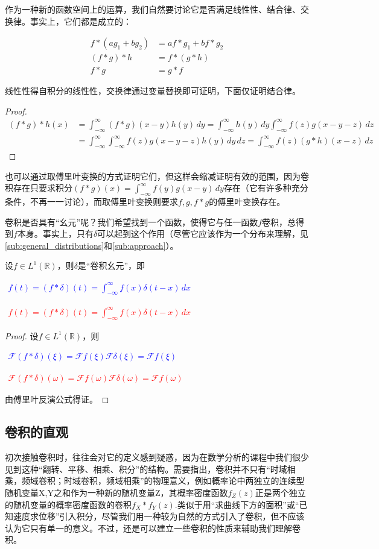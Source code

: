 \documentclass{ctexbook}
\newcommand{\lr}[2]{%
    \begin{center}
    \begin{minipage}[t]{0.45\textwidth}
        \centering
        \allowdisplaybreaks
        \textcolor{blue}{%
            \begin{varwidth}{\linewidth}
            $\begin{aligned}
            #1
            \end{aligned}$
            \end{varwidth}
        }
    \end{minipage}
    \hfill
    \begin{minipage}[t]{0.45\textwidth}
        \centering
        \allowdisplaybreaks
        \textcolor{red}{%
            \begin{varwidth}{\linewidth}
            $\begin{aligned}
            #2
            \end{aligned}$
            \end{varwidth}
        }
    \end{minipage}
\end{center}
}
\begin{document}
作为一种新的函数空间上的运算，我们自然要讨论它是否满足线性性、结合律、交换律。事实上，它们都是成立的：
\begin{proposition}
    \begin{align*}
    f*(ag_1+bg_2) & =af*g_1+bf*g_2 \\
    (f*g)*h       & =f*(g*h)       \\
    f*g           & =g*f
\end{align*}
\end{proposition}
线性性得自积分的线性性，交换律通过变量替换即可证明，下面仅证明结合律。
\begin{proof}
\begin{align*}
    (f*g)*h(x) & =\int_{-\infty}^{\infty}(f*g)(x-y)h(y)\,dy=\int_{-\infty}^{\infty}h(y)\,dy\int_{-\infty}^{\infty}f(z)g(x-y-z)\,dz \\
               & =\int_{-\infty}^{\infty}\int_{-\infty}^{\infty}f(z)g(x-y-z)h(y)\,dy\,dz=\int_{-\infty}^{\infty}f(z)(g*h)(x-z)\,dz
\end{align*}
\end{proof}

也可以通过取傅里叶变换的方式证明它们，但这样会缩减证明有效的范围，因为卷积存在只要求积分$(f*g)(x)=\int_{-\infty}^{\infty}f(y)g(x-y)\,dy$存在（它有许多种充分条件，不再一一讨论），而取傅里叶变换则要求$f,g,f*g$的傅里叶变换存在。

卷积是否具有“幺元”呢？我们希望找到一个函数，使得它与任一函数$f$卷积，总得到$f$本身。事实上，只有$\delta$可以起到这个作用（尽管它应该作为一个分布来理解，见\ref{sub:general_distributions}和\ref{sub:approach}）。
\begin{proposition}[卷积幺元]
    设$f\in L^1(\mathbb{R})$，则$\delta$是“卷积幺元”，即
    \lr{
    f(t)=(f*\delta)(t)=\int_{-\infty}^{\infty}f(x)\delta(t-x)\,dx
}{
    f(t)=(f*\delta)(t)=\int_{-\infty}^{\infty}f(x)\delta(t-x)\,dx
}
\end{proposition}
\begin{proof}
设$f\in L^1(\mathbb{R})$，则\lr{
\mathcal{F} (f*\delta)(\xi)=\mathcal{F} f(\xi)\mathcal{F} \delta(\xi)=\mathcal{F} f(\xi)
}{
    \mathcal{F} (f*\delta)(\omega)=\mathcal{F} f(\omega)\mathcal{F} \delta(\omega)=\mathcal{F} f(\omega)
}
由傅里叶反演公式得证。
\end{proof}

\subsection{卷积的直观}\label{sub:intuition_of_convolution}
初次接触卷积时，往往会对它的定义感到疑惑，因为在数学分析的课程中我们很少见到这种“翻转、平移、相乘、积分”的结构。需要指出，卷积并不只有“时域相乘，频域卷积；时域卷积，频域相乘”的物理意义，例如概率论中两独立的连续型随机变量X,Y之和作为一种新的随机变量Z，其概率密度函数$f_Z(z)$正是两个独立的随机变量的概率密度函数的卷积$f_X*f_Y(z)$.类似于用“求曲线下方的面积”或“已知速度求位移”引入积分，尽管我们用一种较为自然的方式引入了卷积，但不应该认为它只有单一的意义。不过，还是可以建立一些卷积的性质来辅助我们理解卷积。
\end{document}
